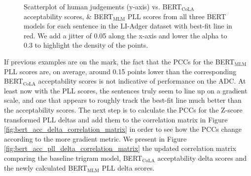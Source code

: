 \begin{figure}[h!]
    \caption[Human judgements vs. BERT acceptability \& PLL scores \newline on LI-Adger dataset]{Scatterplot of human judgements (y-axis) vs. BERT$_{\mathrm{CoLA}}$ acceptability scores, \& BERT$_{\mathrm{MLM}}$ PLL scores from all three BERT models for each sentence in the LI-Adger dataset with best-fit line in red.  We add a jitter of 0.05 along the x-axis and lower the alpha to 0.3 to highlight the density of the points.}
    \label{fig:bert_acc_pll_correlation_plot}
\end{figure}
\clearpage
If previous examples are on the mark, the fact that the PCCs for the BERT$_\mathrm{MLM}$ PLL scores are, on average, around 0.15 points lower than the corresponding BERT$_\mathrm{CoLA}$ acceptability scores is not indicative of performance on the ADC.  At least now with the PLL scores, the sentences truly seem to line up on a gradient scale, and one that appears to roughly track the best-fit line much better than the acceptability scores.  The next step is to calculate the PCCs for the Z-score transformed PLL deltas and add them to the correlation matrix in Figure \ref{fig:bert_acc_delta_correlation_matrix} in order to see how the PCCs change according to the more gradient metric.  We present in Figure \ref{fig:bert_acc_pll_delta_correlation_matrix} the updated correlation matrix comparing the baseline trigram model, BERT$_{\mathrm{CoLA}}$ acceptability delta scores and the newly calculated BERT$_{\mathrm{MLM}}$ PLL delta scores.

